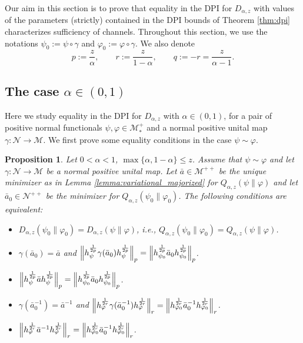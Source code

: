 \documentclass[12pt]{article}
\newtheorem{prop}[theorem]{Proposition}
\theoremstyle{definition}
\theoremstyle{remark}
\numberwithin{equation}{section}
\def\Me{\mathcal M}
\def\Ne{\mathcal N}
\def\ffi{\varphi}
\begin{document}
Our aim in this section is to prove that equality in {the} DPI for $D_{\alpha,z}$ with 
values of the parameters (strictly) contained in the DPI bounds of Theorem \ref{thm:dpi}
characterizes sufficiency of channels. Throughout this section, we use the
notations $\psi_0:=\psi\circ\gamma$ and $\ffi_0:=\ffi\circ\gamma$. We also denote
\[
p:=\frac{z}{\alpha},\qquad r:=\frac{z}{1-\alpha},\qquad q:=-r=\frac{z}{\alpha-1}. 
\]


\subsection{The case $\alpha\in (0,1)$}

Here we study equality in {the} DPI for $D_{\alpha,z}$ with $\alpha\in (0,1)$,  for a pair of positive
normal functionals $\psi,\ffi\in \Me_*^+$ and a normal positive unital map $\gamma:\Ne\to \Me$. We first
prove some equality conditions  in the case $\psi\sim \ffi$. 

\begin{prop}\label{prop:DPI_equality}
Let $0<\alpha<1$, $\max\{\alpha,1-\alpha\}\le z$.  Assume that $\psi\sim \ffi$ and  let
$\gamma:\Ne\to \Me$ be a normal positive unital map. Let 
$\bar a\in \Me^{++}$  
be the unique minimizer as in Lemma \ref{lemma:variational_majorized} for
$Q_{\alpha,z}(\psi\|\ffi)$ and let $\bar a_0\in \Ne^{++}$ be the minimizer for
$Q_{\alpha,z}(\psi_0\|\ffi_0)$. The following conditions are equivalent:
\begin{itemize}
\item[(i)] $D_{\alpha,z}(\psi_0\|\ffi_0)=D_{\alpha,z}(\psi\|\ffi)$, i.e.,
$Q_{\alpha,z}(\psi_0\|\ffi_0)=Q_{\alpha,z}(\psi\|\ffi)$.
\item[(ii)] $\gamma(\bar a_0)=\bar a$ and
$\Big\|h_\psi^{1\over2p}\gamma(\bar a_0)h_\psi^{1\over2p}\Big\|_{p}
=\Big\|h_{\psi_0}^{1\over2p}\bar a_0h_{\psi_0}^{1\over2p}\Big\|_{p}$.
\item[(iii)] $\Big\|h_\psi^{1\over2p}\bar ah_\psi^{1\over2p}\Big\|_{p}
=\Big\|h_{\psi_0}^{1\over2p}\bar a_0h_{\psi_0}^{1\over2p}\Big\|_{p}$.
\item[(iv)] $\gamma(\bar a_0^{-1})=\bar a^{-1}$ and
$\Big\|h_\ffi^{1\over2r}\gamma(\bar a_0^{-1})h_\ffi^{1\over2r}\Big\|_{r}
=\Big\|h_{\ffi_0}^{1\over2r}\bar a_0^{-1}h_{\ffi_0}^{1\over2r}\Big\|_{r}$.
\item[(v)] $\Big\|h_\ffi^{1\over2r}\bar a^{-1}h_\ffi^{1\over2r}\Big\|_{r}
=\Big\|h_{\ffi_0}^{1\over2r}\bar a_0^{-1}h_{\ffi_0}^{1\over2r}\Big\|_{r}$.
\end{itemize}
\end{prop}
\end{document}
